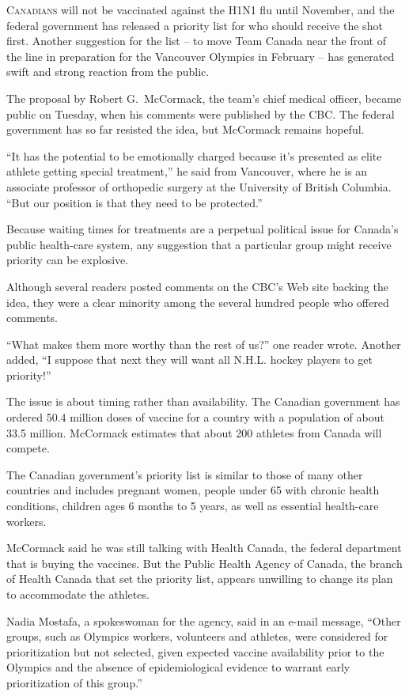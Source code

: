 ﻿\documentclass[12pt]{article}
\begin{document}
\lettrine{C}{anadians} will not be vaccinated against the H1N1 flu until
November, and the federal government has released a priority list for who should receive the shot
first. Another suggestion for the list -- to move Team Canada near the front of the line in
preparation for the Vancouver Olympics in February -- has generated swift and strong reaction from
the public.

The proposal by Robert G.~McCormack, the team's chief medical officer, became public on Tuesday,
when his comments were published by the CBC. The federal government has so far resisted the idea,
but McCormack remains hopeful.

``It has the potential to be emotionally charged because it's presented as elite athlete getting
special treatment,'' he said from Vancouver, where he is an associate professor of orthopedic
surgery at the University of British Columbia. ``But our position is that they need to be
protected.''

Because waiting times for treatments are a perpetual\cite{perpetual} political issue for Canada's
public health-care system, any suggestion that a particular group might receive priority can be
explosive.

Although several readers posted comments on the CBC's Web site backing the idea, they were a clear
minority among the several hundred people who offered comments.

``What makes them more worthy than the rest of us?'' one reader wrote. Another added, ``I suppose
that next they will want all N.H.L. hockey players to get priority!''

The issue is about timing rather than availability. The Canadian government has ordered 50.4 million
doses of vaccine for a country with a population of about 33.5 million. McCormack estimates that
about 200 athletes from Canada will compete.

The Canadian government's priority list is similar to those of many other countries and includes
pregnant women, people under 65 with chronic health conditions, children ages 6 months to 5 years,
as well as essential health-care workers.

McCormack said he was still talking with Health Canada, the federal department that is buying the
vaccines. But the Public Health Agency of Canada, the branch of Health Canada that set the priority
list, appears unwilling to change its plan to accommodate the athletes.

Nadia Mostafa, a spokeswoman for the agency, said in an e-mail message, ``Other groups, such as
Olympics workers, volunteers and athletes, were considered for prioritization but not selected,
given expected vaccine availability prior to the Olympics and the absence of epidemiological
evidence to warrant early prioritization of this group.''
\end{document}
